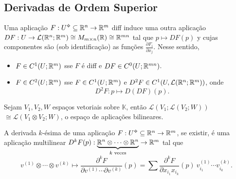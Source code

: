 \subsection{Derivadas de Ordem Superior}

\begin{note}
    Uma aplicação \(F:U\ab\subseteq \R^n \to \R^m\) diff induce uma outra aplicação \(DF: U \to \mathcal{L}(\mathbb{R}^n;\mathbb{R}^m)\cong M_{m\times n }(\mathbb{R}) \cong \mathbb{R}^{mn}\) tal que \(p \mapsto DF(p)\) y cujas componentes são (sob identificação) as funções \(\frac{\partial F_i}{\partial x_j}\). Nesse sentido,   
    \begin{itemize}
        \item \(F \in C^1(U; \mathbb{R}^m)\) sse \(F\) é diff e \(DF \in C^0(U;\mathbb{R}^{mn})\).
        \item \(F \in C^2(U; \mathbb{R}^m)\) sse \(F \in C^1(U; \mathbb{R}^m)\) e \(D^2F \in C^1(U, \mathcal{L}(\mathbb{R}^n; \mathbb{R}^m))\), onde 
        \[D^2F: p \mapsto D (DF) (p).\]
    \end{itemize}
\end{note}

\begin{proposition}
    Sejam \(V_1, V_2, W\) espaços vetoriais sobre \(\mathbb{K}\), então \(\mathcal{L}(V_1;\mathcal{L}(V_2;W))\) \( \cong \mathcal{L}(V_1\otimes V_2;W)\), o espaço de aplicações bilineares.  
\end{proposition}

\begin{definition}
    A derivada \(k\)-ésima de uma aplicação \(F:U\ab \subseteq \R^n \to \R^m\), se existir, é uma aplicação multilinear \(D^kF(p): \underbrace{\mathbb{R}^n \otimes \cdots \otimes \mathbb{R}^n}_{k \text{ veces}} \to \mathbb{R}^m\) tal que 
    \[v^{(1)}\otimes \cdots \otimes v^{(k)}\mapsto \frac{\partial^k F}{ \partial v^{(1)}\cdots \partial v^{(k)}}(p) = \sum \frac{\partial^k F}{\partial x_{i_1} x_{i_k}} (p) \ v_{i_1}^{(1)}\cdots v_{i_k}^{(k)}. \]
\end{definition}